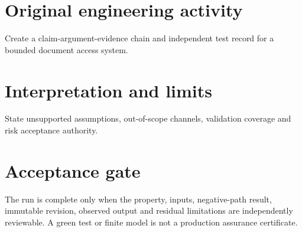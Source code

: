 \documentclass[10pt,letterpaper]{article}
\begin{document}
\section{Original engineering activity}
Create a claim-argument-evidence chain and independent test record for a bounded document access system.
\section{Interpretation and limits}
State unsupported assumptions, out-of-scope channels, validation coverage and risk acceptance authority.
\section{Acceptance gate}
The run is complete only when the property, inputs, negative-path result, immutable revision, observed output and residual limitations are independently reviewable. A green test or finite model is not a production assurance certificate.
\end{document}
